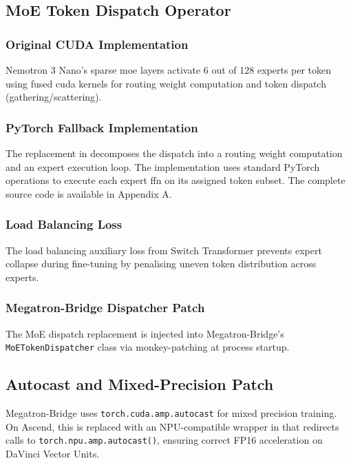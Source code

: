 \subsection{MoE Token Dispatch Operator}
\label{sec:moe-operator}

\subsubsection{Original CUDA Implementation}

Nemotron 3 Nano's sparse \acrshort{moe} layers activate 6 out of
128 experts per token using fused \acrshort{cuda} kernels for
routing weight computation and token dispatch (gathering/scattering).

\subsubsection{PyTorch Fallback Implementation}

The replacement in  decomposes
the dispatch into a routing weight computation and an expert execution
loop. The implementation uses standard PyTorch operations to execute
each expert \acrshort{ffn} on its assigned token subset. The complete
source code is available in Appendix A.

\subsubsection{Load Balancing Loss}

The load balancing auxiliary loss from Switch Transformer prevents
expert collapse during fine-tuning by penalising uneven token
distribution across experts.

\subsubsection{Megatron-Bridge Dispatcher Patch}

The MoE dispatch replacement is injected into Megatron-Bridge's
\texttt{MoETokenDispatcher} class via monkey-patching at process
startup.

\subsection{Autocast and Mixed-Precision Patch}
\label{subsec:autocast-patch}

Megatron-Bridge uses \texttt{torch.cuda.amp.autocast} for mixed
precision training. On Ascend, this is replaced with an
NPU-compatible wrapper in  that
redirects calls to \texttt{torch.npu.amp.autocast()}, ensuring
correct FP16 acceleration on DaVinci Vector Units.
